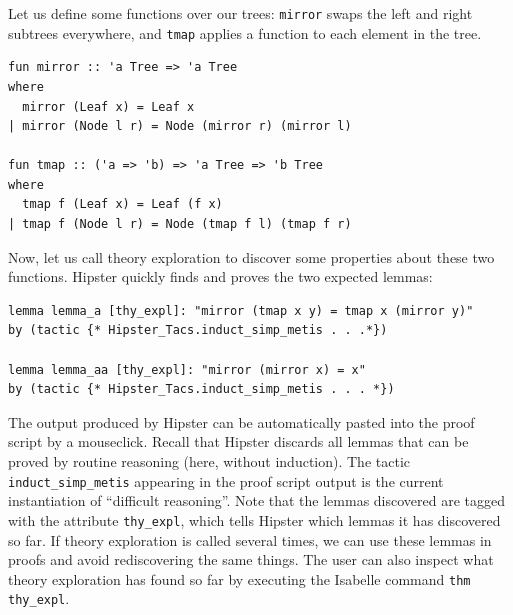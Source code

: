 Let us define some functions over our trees: \texttt{mirror} swaps the left and right subtrees everywhere, and \texttt{tmap} applies a function to each element in the tree.
\begin{small}
\begin{verbatim}
fun mirror :: 'a Tree => 'a Tree
where
  mirror (Leaf x) = Leaf x
| mirror (Node l r) = Node (mirror r) (mirror l)

fun tmap :: ('a => 'b) => 'a Tree => 'b Tree
where
  tmap f (Leaf x) = Leaf (f x)
| tmap f (Node l r) = Node (tmap f l) (tmap f r) 
\end{verbatim} 
\end{small}
Now, let us call theory exploration to discover some properties about these two functions. Hipster quickly finds and proves the two expected lemmas:  
\begin{small}
\begin{verbatim}
lemma lemma_a [thy_expl]: "mirror (tmap x y) = tmap x (mirror y)"
by (tactic {* Hipster_Tacs.induct_simp_metis . . .*})

lemma lemma_aa [thy_expl]: "mirror (mirror x) = x"
by (tactic {* Hipster_Tacs.induct_simp_metis . . . *})
\end{verbatim}
\end{small}
The output produced by Hipster can be automatically pasted into the proof script by a mouseclick. Recall that Hipster discards all lemmas that can be proved by routine reasoning (here, without induction). The tactic \texttt{induct\_simp\_metis} appearing in the proof script output is the current instantiation of ``difficult reasoning''. Note that the lemmas discovered are tagged with the attribute \texttt{thy\_expl}, which tells Hipster which lemmas it has discovered so far. If theory exploration is called several times, we can use these lemmas in proofs and avoid rediscovering the same things. The user can also inspect what theory exploration has found so far by executing the Isabelle command \texttt{thm thy\_expl}.

